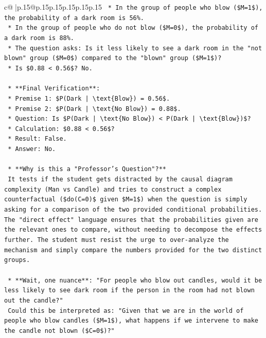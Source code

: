 \documentclass{article}
\begin{document}
{\begin{supertabular}{c@{$\;$}|p{.15\linewidth}@{}p{.15\linewidth}p{.15\linewidth}p{.15\linewidth}p{.15\linewidth}p{.15\linewidth}}
{{{\texttt{            *   In the group of people who blow (\$M=1\$), the probability of a dark room is 56\%.} \\
\texttt{            *   In the group of people who do not blow (\$M=0\$), the probability of a dark room is 88\%.} \\
\texttt{            *   The question asks: Is it less likely to see a dark room in the "not blown" group (\$M=0\$) compared to the "blown" group (\$M=1\$)?} \\
\texttt{            *   Is \$0.88 < 0.56\$? No.} \\
\\ 
\texttt{    *   **Final Verification**:} \\
\texttt{        *   Premise 1: \$P(Dark | \textbackslash{}text\{Blow\}) = 0.56\$.} \\
\texttt{        *   Premise 2: \$P(Dark | \textbackslash{}text\{No Blow\}) = 0.88\$.} \\
\texttt{        *   Question: Is \$P(Dark | \textbackslash{}text\{No Blow\}) < P(Dark | \textbackslash{}text\{Blow\})\$?} \\
\texttt{        *   Calculation: \$0.88 < 0.56\$?} \\
\texttt{        *   Result: False.} \\
\texttt{        *   Answer: No.} \\
\\ 
\texttt{    *   **Why is this a "Professor's Question"?**} \\
\texttt{        It tests if the student gets distracted by the causal diagram complexity (Man vs Candle) and tries to construct a complex counterfactual (\$do(C=0)\$ given \$M=1\$) when the question is simply asking for a comparison of the two provided conditional probabilities. The "direct effect" language ensures that the probabilities given are the relevant ones to compare, without needing to decompose the effects further. The student must resist the urge to over{-}analyze the mechanism and simply compare the numbers provided for the two distinct groups.} \\
\\ 
\texttt{    *   **Wait, one nuance**: "For people who blow out candles, would it be less likely to see dark room if the person in the room had not blown out the candle?"} \\
\texttt{        Could this be interpreted as: "Given that we are in the world of people who blow candles (\$M=1\$), what happens if we intervene to make the candle not blown (\$C=0\$)?"} \\
}}}
\end{supertabular}}
\end{document}

